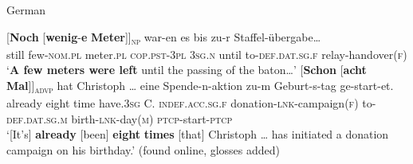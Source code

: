 \begin{exe}
	\ex German
	\begin{xlist}
		\ex\label{exScalarIntroGermanWenigeMeter}
\gll \textup{[}\textbf{Noch} \textup{[}\textbf{wenig}-\textbf{e} \textbf{Meter}\textup{]]\textsubscript{\textsc{np}}} war-en es bis zu-r Staffel-übergabe…\\
	\phantom{[}still \phantom{[}few-\textsc{nom}.\textsc{pl} meter.\textsc{pl} \textsc{cop}.\textsc{pst}-3\textsc{pl} 3\textsc{sg}.\textsc{n} until to-\textsc{def}.\textsc{dat}.\textsc{sg}.\textsc{f} relay-handover(\textsc{f})\\
	\glt \lq \textbf{A few meters were left} until the passing of the baton…\rq
	\ex\label{exScalarIntroGermanSpenden}
	\gll
	\textup{[}\textbf{Schon} \textup{[}\textbf{acht} \textbf{Mal}\textup{]]\textsubscript{\textsc{advp}}}  hat Christoph … eine Spende-n-aktion zu-m Geburt-s-tag ge-start-et.\\
	already \phantom{[}eight time have.3\textsc{sg} C. {} \textsc{indef}.\textsc{acc}.\textsc{sg}.\textsc{f} donation-\textsc{lnk}-campaign(\textsc{f}) to-\textsc{def}.\textsc{dat}.\textsc{sg}.\textsc{m} birth-\textsc{lnk}-day(\textsc{m}) \textsc{ptcp}-start-\textsc{ptcp}\\
	\glt \lq [It's] \textbf{already} [been] \textbf{eight} \textbf{times} [that] Christoph … has initiated a donation campaign on his birthday.\rq{ }(found online, glosses added)%
		\end{xlist}
\end{exe}


